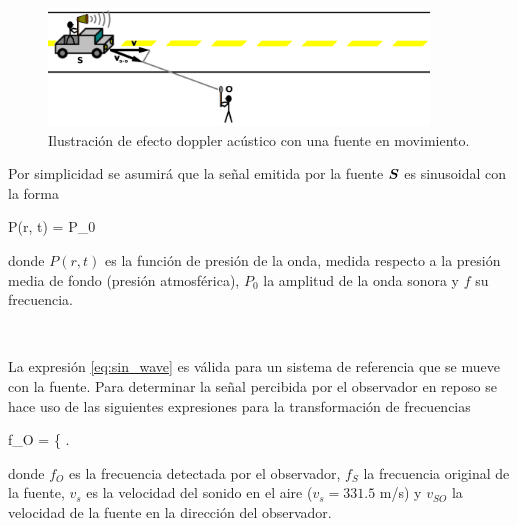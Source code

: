 \
\begin{figure}[htbp]
	\centering
	\includegraphics[width=0.90\textwidth]
	{./pictures/doppler.png}

	\caption{\small{Ilustración de efecto doppler acústico con una 
	fuente en movimiento.}}
	
	\label{fig:doppler}
\end{figure}


Por simplicidad se asumirá que la señal emitida por la fuente $\boldsymbol{ S }$ es
sinusoidal con la forma

{P(r, t) = P_0\sin{}}

donde $P(r, t)$ es la función de presión de la onda, medida respecto a la 
presión media de fondo (presión atmosférica), $P_0$ la amplitud de la onda 
sonora y $f$ su frecuencia.

\

La expresión \ref{eq:sin_wave} es válida para un sistema de referencia que 
se mueve con la fuente. Para determinar la señal percibida por el observador
en reposo se hace uso de las siguientes expresiones para la transformación
de frecuencias


{f_O = \left\{  \right.}


donde $f_O$ es la frecuencia detectada por el observador, $f_S$ la 
frecuencia original de la fuente, $v_s$ es la velocidad del sonido en el aire 
($v_s = 331.5$ m/s) y $v_{SO}$ la velocidad de la fuente en la dirección del 
observador.

